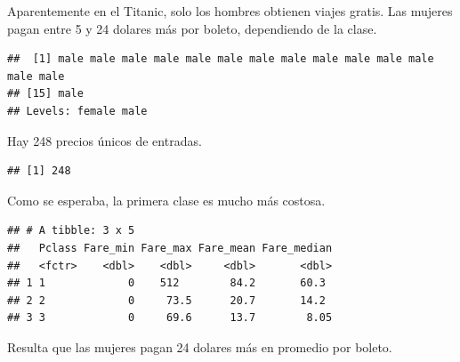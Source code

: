 \documentclass[]{article}
\newenvironment{Shaded}{\begin{snugshade}}{\end{snugshade}}
\newcommand{\KeywordTok}[1]{\textcolor[rgb]{0.13,0.29,0.53}{\textbf{#1}}}
\newcommand{\DecValTok}[1]{\textcolor[rgb]{0.00,0.00,0.81}{#1}}
\newcommand{\StringTok}[1]{\textcolor[rgb]{0.31,0.60,0.02}{#1}}
\newcommand{\OperatorTok}[1]{\textcolor[rgb]{0.81,0.36,0.00}{\textbf{#1}}}
\newcommand{\NormalTok}[1]{#1}
\begin{document}
Aparentemente en el Titanic, solo los hombres obtienen viajes gratis.
Las mujeres pagan entre 5 y 24 dolares más por boleto, dependiendo de la
clase.

\begin{Shaded}
\end{Shaded}

\begin{verbatim}
##  [1] male male male male male male male male male male male male male male
## [15] male
## Levels: female male
\end{verbatim}

Hay 248 precios únicos de entradas.

\begin{Shaded}
\end{Shaded}

\begin{verbatim}
## [1] 248
\end{verbatim}

Como se esperaba, la primera clase es mucho más costosa.

\begin{Shaded}
\end{Shaded}

\begin{verbatim}
## # A tibble: 3 x 5
##   Pclass Fare_min Fare_max Fare_mean Fare_median
##   <fctr>    <dbl>    <dbl>     <dbl>       <dbl>
## 1 1             0    512        84.2       60.3 
## 2 2             0     73.5      20.7       14.2 
## 3 3             0     69.6      13.7        8.05
\end{verbatim}

Resulta que las mujeres pagan 24 dolares más en promedio por boleto.
\end{document}
